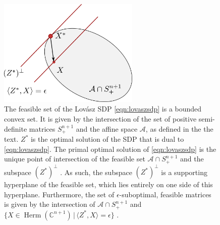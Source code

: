 \begin{figure}
\begin{center}
\includegraphics[width=0.6\textwidth]{images/feasibleset.png}
\end{center}
\caption{The feasible set of the Lovász SDP \ref{eqn:lovaszsdp} is a bounded convex set. It is given by the intersection of the set of positive semi-definite matrices $S_{+}^{n+1}$ and the affine space $\mathcal{A}$, as defined in the the text. $Z^{*}$ is the optimal solution of the SDP that is dual to \ref{eqn:lovaszsdp}. The primal optimal solution of \ref{eqn:lovaszsdp} is the unique point of intersection of the feasible set $\mathcal{A}\cap S_{+}^{n+1}$ and the subspace $(Z^{*})^{\perp}$ \cite{Bharti2019}. As such, the subspace $(Z^{*})^{\perp}$ is a supporting hyperplane of the feasible set, which lies entirely on one side of this hyperplane.  Furthermore, the set of $\epsilon$-suboptimal, feasible matrices is given by the intersection of $\mathcal{A}\cap S_{+}^{n+1}$ and $\{X\in \operatorname{Herm}(\mathbb{C}^{n+1})\,\vert\, \langle Z^{*}, X\rangle = \epsilon\}$ \cite{Bharti2019}.}
\label{fig:feasibleset}
\end{figure}

